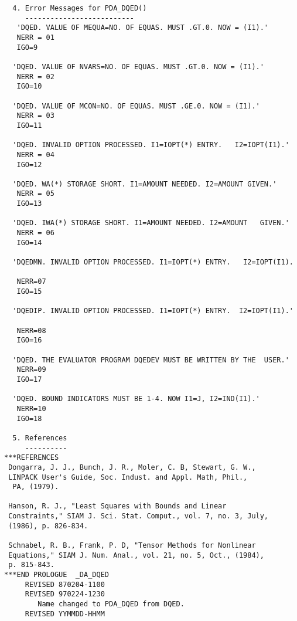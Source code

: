 \begin{verbatim}
  4. Error Messages for PDA_DQED()
     --------------------------
   'DQED. VALUE OF MEQUA=NO. OF EQUAS. MUST .GT.0. NOW = (I1).'
   NERR = 01
   IGO=9

  'DQED. VALUE OF NVARS=NO. OF EQUAS. MUST .GT.0. NOW = (I1).'
   NERR = 02
   IGO=10

  'DQED. VALUE OF MCON=NO. OF EQUAS. MUST .GE.0. NOW = (I1).'
   NERR = 03
   IGO=11

  'DQED. INVALID OPTION PROCESSED. I1=IOPT(*) ENTRY.   I2=IOPT(I1).'
   NERR = 04
   IGO=12

  'DQED. WA(*) STORAGE SHORT. I1=AMOUNT NEEDED. I2=AMOUNT GIVEN.'
   NERR = 05
   IGO=13

  'DQED. IWA(*) STORAGE SHORT. I1=AMOUNT NEEDED. I2=AMOUNT   GIVEN.'
   NERR = 06
   IGO=14

  'DQEDMN. INVALID OPTION PROCESSED. I1=IOPT(*) ENTRY.   I2=IOPT(I1).

   NERR=07
   IGO=15

  'DQEDIP. INVALID OPTION PROCESSED. I1=IOPT(*) ENTRY.  I2=IOPT(I1).'

   NERR=08
   IGO=16

  'DQED. THE EVALUATOR PROGRAM DQEDEV MUST BE WRITTEN BY THE  USER.'
   NERR=09
   IGO=17

  'DQED. BOUND INDICATORS MUST BE 1-4. NOW I1=J, I2=IND(I1).'
   NERR=10
   IGO=18

  5. References
     ----------
***REFERENCES
 Dongarra, J. J., Bunch, J. R., Moler, C. B, Stewart, G. W.,
 LINPACK User's Guide, Soc. Indust. and Appl. Math, Phil.,
  PA, (1979).

 Hanson, R. J., "Least Squares with Bounds and Linear
 Constraints," SIAM J. Sci. Stat. Comput., vol. 7, no. 3, July,
 (1986), p. 826-834.

 Schnabel, R. B., Frank, P. D, "Tensor Methods for Nonlinear
 Equations," SIAM J. Num. Anal., vol. 21, no. 5, Oct., (1984),
 p. 815-843.
***END PROLOGUE  _DA_DQED
     REVISED 870204-1100
     REVISED 970224-1230
        Name changed to PDA_DQED from DQED.
     REVISED YYMMDD-HHMM
\end{verbatim}




